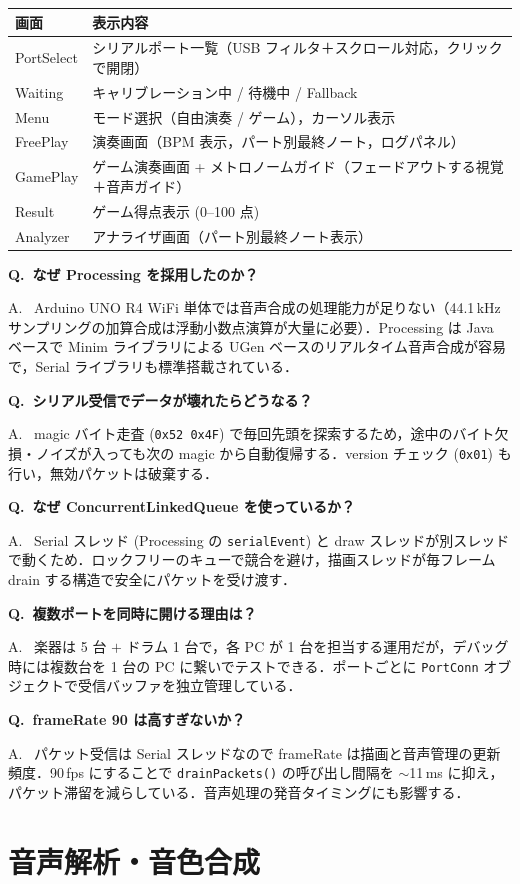 \documentclass[uplatex,dvipdfmx,a4paper,10pt]{jsarticle}
\newcommand{\QA}[2]{%
  \par\noindent\textbf{\textcolor{qcolor}{Q.~#1}}%
  \par\noindent\textcolor{acolor}{A.~#2}\medskip%
}
\begin{document}
\begin{tabularx}{\textwidth}{lX}
\toprule
画面 & 表示内容 \\
\midrule
PortSelect & シリアルポート一覧（USB フィルタ＋スクロール対応，クリックで開閉） \\
Waiting & キャリブレーション中 / 待機中 / Fallback \\
Menu & モード選択（自由演奏 / ゲーム），カーソル表示 \\
FreePlay & 演奏画面（BPM 表示，パート別最終ノート，ログパネル） \\
GamePlay & ゲーム演奏画面 + メトロノームガイド（フェードアウトする視覚＋音声ガイド） \\
Result & ゲーム得点表示 (0--100 点) \\
Analyzer & アナライザ画面（パート別最終ノート表示） \\
\bottomrule
\end{tabularx}

\QA{なぜ Processing を採用したのか？}{
Arduino UNO R4 WiFi 単体では音声合成の処理能力が足りない（44.1\,kHz サンプリングの加算合成は浮動小数点演算が大量に必要）．Processing は Java ベースで Minim ライブラリによる UGen ベースのリアルタイム音声合成が容易で，Serial ライブラリも標準搭載されている．}

\QA{シリアル受信でデータが壊れたらどうなる？}{
magic バイト走査 (\texttt{0x52 0x4F}) で毎回先頭を探索するため，途中のバイト欠損・ノイズが入っても次の magic から自動復帰する．version チェック (\texttt{0x01}) も行い，無効パケットは破棄する．}

\QA{なぜ ConcurrentLinkedQueue を使っているか？}{
Serial スレッド (Processing の \texttt{serialEvent}) と draw スレッドが別スレッドで動くため．ロックフリーのキューで競合を避け，描画スレッドが毎フレーム drain する構造で安全にパケットを受け渡す．}

\QA{複数ポートを同時に開ける理由は？}{
楽器は 5 台 $+$ ドラム 1 台で，各 PC が 1 台を担当する運用だが，デバッグ時には複数台を 1 台の PC に繋いでテストできる．ポートごとに \texttt{PortConn} オブジェクトで受信バッファを独立管理している．}

\QA{frameRate 90 は高すぎないか？}{
パケット受信は Serial スレッドなので frameRate は描画と音声管理の更新頻度．90\,fps にすることで \texttt{drainPackets()} の呼び出し間隔を $\sim$11\,ms に抑え，パケット滞留を減らしている．音声処理の発音タイミングにも影響する．}

\section{音声解析・音色合成}
\end{document}

